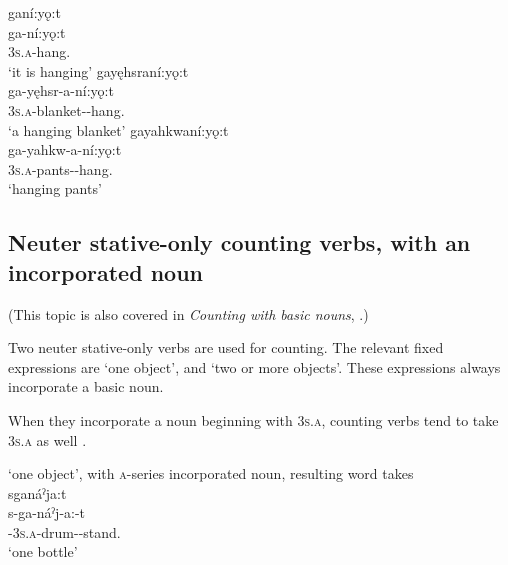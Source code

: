 \ea\label{ex:positppchoiceex701}
\ea ganí:yǫ:t\\
\gll ga-ní:yǫ:t \\
\textsc{3s.a}-hang.{\stative}\\
\glt ‘it is hanging’ 
\ex gayęhsraní:yǫ:t\\
\gll ga-yęhsr-a-ní:yǫ:t\\
 \textsc{3s.a}-blanket-{\joinerA}-hang.{\stative}\\
\glt `a hanging blanket'
\ex gayahkwaní:yǫ:t\\
\gll ga-yahkw-a-ní:yǫ:t\\
 \textsc{3s.a}-pants-{\joinerA}-hang.{\stative}\\
\glt `hanging pants'
\z
\z


\subsection{Neuter stative-only counting verbs, with an incorporated noun} \label{Neuter stative-only counting verbs, with an incorporated noun}
(This topic is also covered in \textit{Counting with basic nouns}, .) 

Two neuter stative-only verbs are used for counting. The relevant fixed expressions are  ‘one object’, and  ‘two or more objects’. These expressions always incorporate a basic noun.

When they incorporate a noun beginning with  \textsc{3s.a}, counting verbs tend to take  \textsc{3s.a} as well .

\ea\label{ex:countingexagain2}  ‘one object’, with \textsc{a}-series incorporated noun, resulting word takes \\
sganáˀja:t\\
\gll s-ga-náˀj-a:-t\\
 {\repetitive}-\textsc{3s.a}-drum-{\joinerA}-stand.{\stative}\\
\glt `one bottle'
\z


